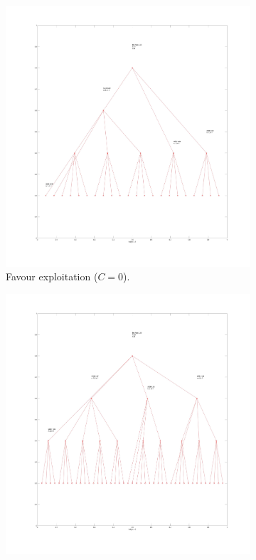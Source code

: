 \documentclass[11pt]{article}
\begin{document}
\begin{figure}
\begin{subfigure}{.33\textwidth}
  \centering
  \includegraphics[width=\linewidth]{img/c0.jpg}
  \caption{Favour exploitation ($C=0$).}
  \label{fig:c0}
\end{subfigure}%
\begin{subfigure}{.33\textwidth}
  \centering
  \includegraphics[width=\linewidth]{img/c05.jpg}

\end{subfigure}
\end{figure}
\end{document}
